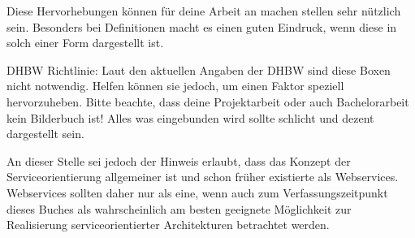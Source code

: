 

\begin{definitionForm}[Definition]
Diese Hervorhebungen können für deine Arbeit an machen stellen sehr nützlich sein. Besonders bei Definitionen macht es einen guten Eindruck, wenn diese in solch einer Form dargestellt ist. 
\end{definitionForm}

DHBW Richtlinie: Laut den aktuellen Angaben der DHBW sind diese Boxen nicht notwendig. Helfen können sie jedoch, um einen Faktor speziell hervorzuheben. Bitte beachte, dass deine Projektarbeit oder auch Bachelorarbeit kein Bilderbuch ist! Alles was eingebunden wird sollte schlicht und dezent dargestellt sein.

\begin{attentionForm}
An dieser Stelle sei jedoch der Hinweis erlaubt, dass das Konzept der Serviceorientierung allgemeiner ist und schon früher existierte als Webservices. Webservices sollten daher nur als eine, wenn auch zum Verfassungszeitpunkt dieses Buches als wahrscheinlich am besten geeignete Möglichkeit zur Realisierung serviceorientierter Architekturen betrachtet werden.
\end{attentionForm}



